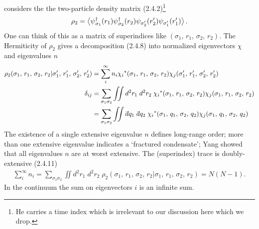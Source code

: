  considers the the two-particle density matrix (2.4.2)\footnote{
    He carries a time index which is irrelevant to our discussion here which we drop.
}
\begin{align}
    \rho_2 = \left\langle \psi{}^{\dagger}_{\sigma_1}(r_1) \psi{}^{\dagger}_{\sigma_2}(r_2) \psi_{\sigma'_{2}}(r'_2) \psi_{\sigma'_1}(r'_1) \right\rangle.
\end{align}
One can think of this as a matrix of superindices like $(\sigma_1,\, r_1,\, \sigma_2,\, r_2)$.
The Hermiticity of $\rho_2$ gives a decomposition (2.4.8) into normalized eigenvectors $\chi$ and eigenvalues $n$
\begin{align}
    \rho_2(\sigma_1,\, r_1,\, \sigma_2,\, r_2 | \sigma'_1,\, r'_1,\, \sigma'_2,\, r'_2)
    &= \sum_i^{\infty} n_i \chi_i\conjugate(\sigma_1,\, r_1,\, \sigma_2,\, r_2) \chi_j(\sigma'_1,\, r'_1,\, \sigma'_2,\, r'_2)
    \\
    \delta_{ij}
    &= \sum_{\sigma_1 \sigma_2} \iint d^2r_1\; d^2r_2\; \chi_i\conjugate(\sigma_1,\, r_1,\, \sigma_2,\, r_2) \chi_j(\sigma_1,\, r_1,\, \sigma_2,\, r_2)
    \\
    &= \sum_{\sigma_1 \sigma_2} \iint \dbar q_1\; \dbar q_2\; \chi_i\conjugate(\sigma_1,\, q_1,\, \sigma_2,\, q_2) \chi_j(\sigma_1,\, q_1,\, \sigma_2,\, q_2)
\end{align}
The existence of a single extensive eigenvalue $n$ defines long-range order; more than one extensive eigenvalue indicates a `fractured condensate'; Yang \cite{yang:1962} showed that all eigenvalues $n$ are at worst extensive.
The (superindex) trace is doubly-extensive (2.4.11)
\begin{align}
    \sum_i^{\infty} n_i = \sum_{\sigma_1 \sigma_2} \iint d^2r_1\; d^2r_2\; \rho_2(\sigma_1,\, r_1,\, \sigma_2,\, r_2 | \sigma_1,\, r_1,\, \sigma_2,\, r_2) = N(N-1).
\end{align}
In the continuum the sum on eigenvectors $i$ is an infinite sum.

